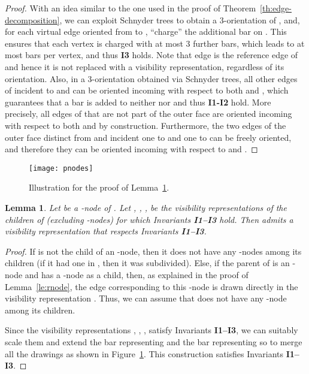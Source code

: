 \documentclass{article}
\newtheorem{lemma}{Lemma}
\begin{document}
\begin{proof}
With an idea similar to the one used in the proof of Theorem~\ref{th:edge-decomposition}, we can exploit Schnyder trees to obtain a 3-orientation of , and, for each virtual edge  oriented from  to , ``charge'' the additional bar on . This ensures that each vertex is charged with at most 3 further bars, which leads to at most  bars per vertex, and thus {\bf I3} holds. Note that edge  is the reference edge of  and hence it is not replaced with a visibility representation, regardless of its orientation. Also, in a 3-orientation obtained via Schnyder trees, all other edges of  incident to  and  can be oriented incoming with respect to both  and , which guarantees that a bar is added to neither  nor  and thus {\bf I1-I2} hold. More precisely, all edges of  that are not part of the outer face are oriented incoming with respect to both  and  by construction. Furthermore, the two edges of the outer face distinct from  and incident one to  and one to  can be freely oriented, and therefore they can be oriented incoming with respect to  and .
\end{proof}


\begin{figure}[t]
\centering
\texttt{[image: pnodes]}
\caption{ Illustration for the proof of Lemma~\ref{le:pnodes}.}\label{fi:pnodes}
\end{figure}

\begin{lemma}\label{le:pnodes}
Let  be a -node of . Let , , ,  be the  visibility representations of the  children of  (excluding -nodes) for which Invariants {\bf I1--I3} hold. Then  admits a visibility representation  that respects Invariants {\bf I1--I3}.
\end{lemma}
\begin{proof}
If  is not the child of an -node, then it does not have any -nodes among its children (if it had one in , then it was subdivided). Else, if the parent of  is an -node  and  has a -node as a child, then, as explained in the proof of Lemma~\ref{le:rnode}, the edge corresponding to this -node is drawn directly in the visibility representation . Thus, we can assume that  does not have any -node among its children.

Since the visibility representations , , ,  satisfy Invariants {\bf I1--I3}, we can suitably scale them and extend the bar representing  and the bar representing  so to merge all the drawings as shown in Figure~\ref{fi:pnodes}. This construction satisfies Invariants {\bf I1--I3}.
\end{proof}
\end{document}
